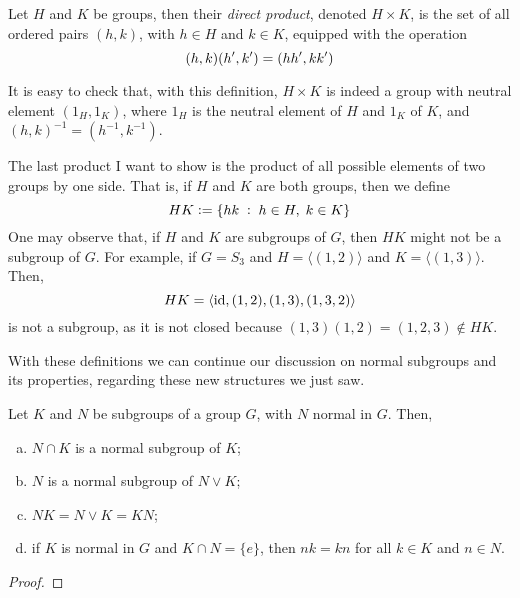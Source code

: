 \documentclass[../main.tex]{subfiles}
\begin{document}
\begin{defi}
\label{def:directproduct} Let $H$ and $K$ be groups, then their \textit{direct product}, denoted $H\times K$, is the set of all ordered pairs $(h,k)$, with $h\in H$ and $k\in K$, equipped with the operation
\begin{equation}
    \notag
    (h,k)(h',k') = (hh',kk')
\end{equation}
\end{defi}

It is easy to check that, with this definition, $H\times K$ is indeed a group with neutral element $(1_H, 1_K)$, where $1_H$ is the neutral element of $H$ and $1_K$ of $K$, and $(h,k)^{-1} = (h^{-1},k^{-1})$.

The last product I want to show is the product of all possible elements of two groups by one side. That is, if $H$ and $K$ are both groups, then we define
\begin{equation}
    \notag
    HK:=\{hk\;:\;h\in H,\;k\in K\}
\end{equation}
One may observe that, if $H$ and $K$ are subgroups of $G$, then $HK$ might not be a subgroup of $G$. For example, if $G = S_3$ and $H = \langle (1,2)\rangle$ and $K = \langle (1,3)\rangle$. Then,
\begin{equation}
    \notag
    HK = \langle \mathrm{id}, (1,2),(1,3), (1,3,2)\rangle
\end{equation}
is not a subgroup, as it is not closed because $(1,3)(1,2) = (1,2,3)\not\in HK$.

With these definitions we can continue our discussion on normal subgroups and its properties, regarding these new structures we just saw.

\begin{prop}
Let $K$ and $N$ be subgroups of a group $G$, with $N$ normal in $G$. Then,
\begin{enumerate}[(a)]
    \item $N\cap K$ is a normal subgroup of $K$;
    \item $N$ is a normal subgroup of $N\vee K$;
    \item $NK = N\vee K = KN$;
    \item if $K$ is normal in $G$ and $K\cap N = \{e\}$, then $nk = kn$ for all $k\in K$ and $n\in N$.
\end{enumerate}
\end{prop}
\begin{proof}
\noproof    
\end{proof}
\end{document}
